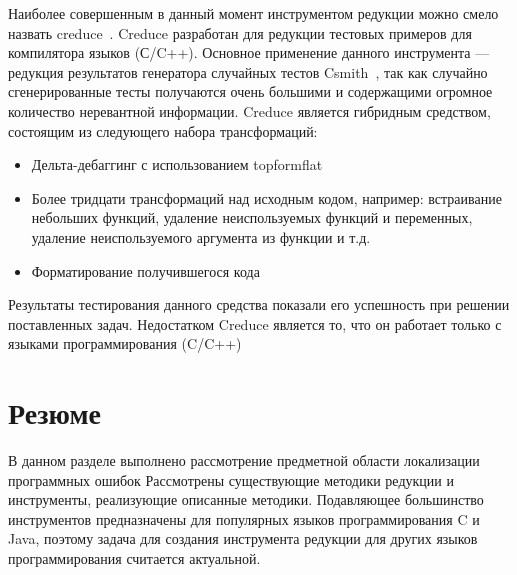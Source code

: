 Наиболее совершенным в данный момент инструментом редукции можно смело назвать creduce~\cite{regehr2012test}. Creduce разработан для редукции тестовых примеров для компилятора языков (С/C++). Основное применение данного инструмента --- редукция результатов генератора случайных тестов Csmith~\cite{yang2011finding}, так как случайно сгенерированные тесты получаются очень большими и содержащими огромное количество неревантной информации. Creduce является гибридным средством, состоящим из следующего набора трансформаций:
\begin{itemize}
	\item Дельта-дебаггинг с использованием topformflat
	\item Более тридцати трансформаций над исходным кодом, например: встраивание небольших функций, удаление неиспользуемых функций и переменных, удаление неиспользуемого аргумента из функции и т.д.
	\item Форматирование получившегося кода
\end{itemize}
Результаты тестирования данного средства показали его успешность при решении поставленных задач. Недостатком Creduce является то, что он работает только с языками программирования (C/C++)  

\section{Резюме}
В данном разделе выполнено рассмотрение предметной области локализации программных ошибок Рассмотрены существу­ющие методики редукции и инструменты, реализующие описанные методики. Подавляющее большинство инструментов предназначены для популярных языков программирования C и Java, поэтому задача для создания инструмента редукции для других языков программирования считается актуальной.